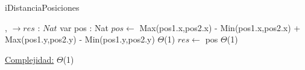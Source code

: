 \begin{Algoritmos}
	\begin{algorithm}[H]
		\caption{iDistanciaPosiciones}
		\begin{algorithmic}
			{, } $\to res$ : $Nat$
			\State var pos : Nat
			\State $pos \gets$ Max(pos1.x,pos2.x) - Min(pos1.x,pos2.x) + Max(pos1.y,pos2.y) - Min(pos1.y,pos2.y) \Comment $\Theta$(1)
			\State $res \gets$ pos \Comment $\Theta$(1)
			\EndProcedure
		\end{algorithmic}
		\underline{Complejidad:} $\Theta$(1)
	\end{algorithm}
	
\end{Algoritmos}